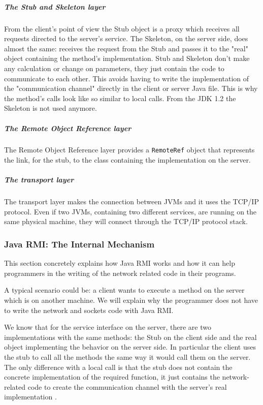 \subparagraph{The Stub and Skeleton layer}
From the client's point of view the Stub object is a proxy which receives all requests directed to the server's service. The Skeleton, on the server side, does almost the same: receives the request from the Stub and passes it to the "real" object containing the method's implementation. Stub and Skeleton don't make any calculation or change on parameters, they just contain the code to communicate to each other. This avoids having to write the implementation of the "communication channel" directly in the client or server Java file. This is why the method's calls look like so similar to local calls. From the JDK 1.2 the Skeleton is not used anymore.
\subparagraph{The Remote Object Reference layer}
The Remote Object Reference layer provides a \verb|RemoteRef| object that represents the link, for the stub, to the class containing the implementation on the server. 
\subparagraph{The transport layer}
The transport layer makes the connection between JVMs and it uses the TCP/IP protocol. Even if two JVMs, containing two different services, are running on the same physical machine, they will connect through the TCP/IP protocol stack. 


\subsubsection{Java RMI: The Internal Mechanism}
\label{JavaRMIinternalMechanism}

This section concretely explains how Java RMI works and how it can 
help programmers in the writing of the network related code in their programs.

A typical scenario could be: a client wants to execute a method on the server which is on another machine. We will explain why the programmer does not have to write the network and sockets code with Java RMI.

We know that for the service interface on the server, there are two implementations with the same methods: the Stub on the client side and the real object implementing the behavior on the server side. In particular the client uses the stub to call all the methods the same way it would call them on the server. The only difference with a local call is that the stub does not contain the concrete implementation of the required function, it just contains the network-related code to create the communication channel with the server's real implementation \cite{RMI-art4}.

